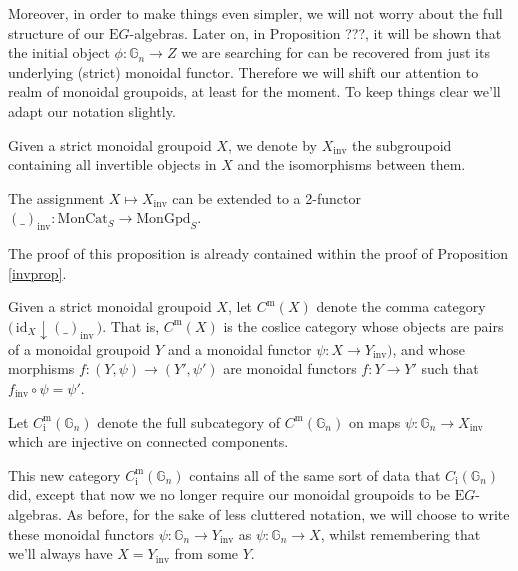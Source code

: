\documentclass{amsart} %
\begin{document}
Moreover, in order to make things even simpler, we will not worry about the full structure of our $\mathrm{E}G$-algebras. Later on, in Proposition ???, it will be shown that the initial object $\phi: \mathbb{G}_n \to Z$ we are searching for can be recovered from just its underlying (strict) monoidal functor. Therefore we will shift our attention to realm of monoidal groupoids, at least for the moment. To keep things clear we'll adapt our notation slightly.

\begin{defi} Given a strict monoidal groupoid $X$, we denote by $X_{\mathrm{inv}}$ the subgroupoid containing all invertible objects in $X$ and the isomorphisms between them. \end{defi}

\begin{prop} The assignment $X \mapsto X_{\mathrm{inv}}$ can be extended to a 2-functor $(\_)_{\mathrm{inv}}: \mathrm{MonCat}_S \to \mathrm{MonGpd}_S$.
\end{prop}

The proof of this proposition is already contained within the proof of Proposition \ref{invprop}.

\begin{defi} Given a strict monoidal groupoid $X$, let $C^{\mathrm{m}}(X)$ denote the comma category $\big( \, \mathrm{id}_X \downarrow (\_)_{\mathrm{inv}} \, \big)$. That is, $C^{\mathrm{m}}(X)$ is the coslice category whose objects are pairs of a monoidal groupoid $Y$ and a monoidal functor $\psi: X \to Y_{\mathrm{inv}})$, and whose morphisms $f: (Y, \psi) \to (Y', \psi')$ are monoidal functors $f: Y \to Y'$ such that $f_{\mathrm{inv}} \circ \psi = \psi'$. \end{defi}

\begin{defi} Let $C^{\mathrm{m}}_{\mathrm{i}}(\mathbb{G}_n)$ denote the full subcategory of $C^{\mathrm{m}}(\mathbb{G}_n)$ on maps $\psi: \mathbb{G}_n \to X_{\mathrm{inv}}$ which are injective on connected components. \end{defi}

This new category $C^{\mathrm{m}}_{\mathrm{i}}(\mathbb{G}_n)$ contains all of the same sort of data that $C_{\mathrm{i}}(\mathbb{G}_n)$ did, except that now we no longer require our monoidal groupoids to be $\mathrm{E}G$-algebras. As before, for the sake of less cluttered notation, we will choose to write these monoidal functors $\psi: \mathbb{G}_n \to Y_{\mathrm{inv}}$ as $\psi: \mathbb{G}_n \to X$, whilst remembering that we'll always have $X = Y_{\mathrm{inv}}$ from some $Y$.
\end{document}
